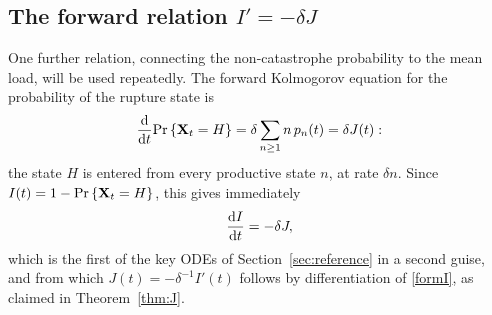 \subsection{The forward relation $I'=-\delta J$}
\label{sec:forwardI}

One further relation, connecting the non-catastrophe probability to the mean
load, will be used repeatedly. The forward Kolmogorov equation for the
probability of the rupture state is
$$\displaystyle\frac{{\rm d} }{{\rm d} t}{\text{Pr}\left\{{{\bf X}_t} = H\right\}} = \delta\sum_{n\ge1} n\,p_n(t) = \delta J(t):$$
the state $H$ is entered from every productive state $n$, at rate $\delta n$.
Since $I(t)=1-{\text{Pr}\left\{{{\bf X}_t}=H\right\}}$, this gives immediately
\begin{equation}
\label{ddIJ}
\displaystyle\frac{{\rm d} I}{{\rm d} t} = -\delta J,
\end{equation}
which is the first of the key ODEs of Section~\ref{sec:reference} in a second
guise, and from which $J(t)=-\delta^{-1}I'(t)$ follows by differentiation of
\eqref{formI}, as claimed in Theorem~\ref{thm:J}.
